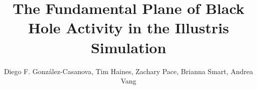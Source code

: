 \documentclass[usenatbib]{emulateapj}
\begin{document}
\title{The Fundamental Plane of Black Hole Activity in the Illustris Simulation}
\author{Diego F. Gonz\'alez-Casanova, Tim Haines, Zachary Pace, Brianna Smart, Andrea Vang}
\address{Astronomy Department, University of Wisconsin-Madison, 475 North Charter Street, Madison, WI 53706-1582, USA}

\maketitle










\end{document}
